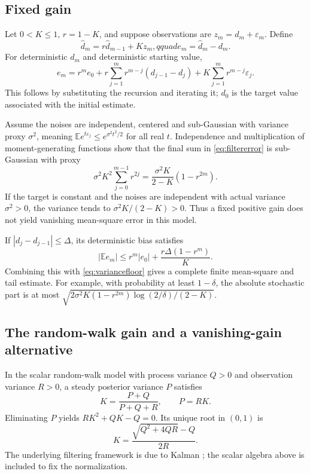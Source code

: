 \documentclass[11pt]{amsart}
\theoremstyle{definition}
\newcommand{\E}{\mathbb E}\newcommand{\Var}{\operatorname{Var}}
\begin{document}
\subsection{Fixed gain}
Let $0<K\le1$, $r=1-K$, and suppose observations are
$z_m=d_m+\varepsilon_m$. Define
\[
 \widehat d_m=r\widehat d_{m-1}+Kz_m,qquad
 e_m=\widehat d_m-d_m.
\]
For deterministic $d_m$ and deterministic starting value,
\begin{equation}\label{eq:filtererror}
 e_m=r^me_0+r\sum_{j=1}^m r^{m-j}(d_{j-1}-d_j)
                   +K\sum_{j=1}^m r^{m-j}\varepsilon_j.
\end{equation}
This follows by substituting the recursion and iterating it; $d_0$
is the target value associated with the initial estimate.

Assume the noises are independent, centered and sub-Gaussian with
variance proxy $\sigma^2$, meaning
$\E e^{t\varepsilon_j}\le e^{\sigma^2t^2/2}$ for all real $t$.
Independence and multiplication of moment-generating functions show
that the final sum in \eqref{eq:filtererror} is sub-Gaussian with proxy
\begin{equation}\label{eq:variancefloor}
 \sigma^2K^2\sum_{j=0}^{m-1}r^{2j}
 =\frac{\sigma^2K}{2-K}(1-r^{2m}).
\end{equation}
If the target is constant and the noises are independent with actual
variance $\sigma^2>0$, the variance tends to
$\sigma^2K/(2-K)>0$. Thus a fixed positive gain does not yield
vanishing mean-square error in this model.

If $|d_j-d_{j-1}|\le\Delta$, its deterministic bias satisfies
\[
 |\E e_m|\le r^m|e_0|+\frac{r\Delta(1-r^m)}K.
\]
Combining this with \eqref{eq:variancefloor} gives a complete
finite mean-square and tail estimate. For example, with probability
at least $1-\delta$, the absolute stochastic part is at most
$\sqrt{2\sigma^2K(1-r^{2m})\log(2/\delta)/(2-K)}$.

\subsection{The random-walk gain and a vanishing-gain alternative}
In the scalar random-walk model with process variance $Q>0$ and
observation variance $R>0$, a steady posterior variance $P$ satisfies
\[
 K=\frac{P+Q}{P+Q+R},\qquad P=R K.
\]
Eliminating $P$ yields $RK^2+QK-Q=0$. Its unique root in $(0,1)$ is
\begin{equation}\label{eq:gain}
 K=\frac{\sqrt{Q^2+4QR}-Q}{2R}.
\end{equation}
The underlying filtering framework is due to Kalman \cite{Kalman};
the scalar algebra above is included to fix the normalization.
\end{document}
